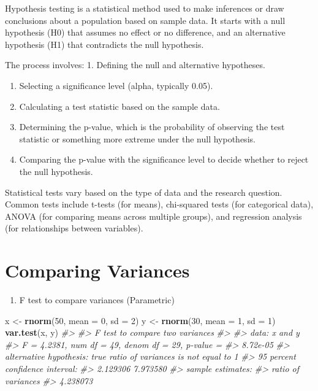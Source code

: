 \documentclass[
]{book}
\newenvironment{Shaded}{\begin{snugshade}}{\end{snugshade}}
\newcommand{\AttributeTok}[1]{\textcolor[rgb]{0.13,0.29,0.53}{#1}}
\newcommand{\CommentTok}[1]{\textcolor[rgb]{0.56,0.35,0.01}{\textit{#1}}}
\newcommand{\DecValTok}[1]{\textcolor[rgb]{0.00,0.00,0.81}{#1}}
\newcommand{\FunctionTok}[1]{\textcolor[rgb]{0.13,0.29,0.53}{\textbf{#1}}}
\newcommand{\NormalTok}[1]{#1}
\newcommand{\OtherTok}[1]{\textcolor[rgb]{0.56,0.35,0.01}{#1}}
\providecommand{\tightlist}{%
  \setlength{\itemsep}{0pt}\setlength{\parskip}{0pt}}
\begin{document}
Hypothesis testing is a statistical method used to make inferences or draw conclusions about a population based on sample data. It starts with a null hypothesis (H0) that assumes no effect or no difference, and an alternative hypothesis (H1) that contradicts the null hypothesis.

The process involves:
1. Defining the null and alternative hypotheses.

\begin{enumerate}
\def\labelenumi{\arabic{enumi}.}
\setcounter{enumi}{1}
\item
  Selecting a significance level (alpha, typically 0.05).
\item
  Calculating a test statistic based on the sample data.
\item
  Determining the p-value, which is the probability of observing the test statistic or something more extreme under the null hypothesis.
\item
  Comparing the p-value with the significance level to decide whether to reject the null hypothesis.
\end{enumerate}

Statistical tests vary based on the type of data and the research question. Common tests include t-tests (for means), chi-squared tests (for categorical data), ANOVA (for comparing means across multiple groups), and regression analysis (for relationships between variables).

\section{Comparing Variances}\label{comparing-variances}

\begin{enumerate}
\def\labelenumi{\alph{enumi}.}
\tightlist
\item
  F test to compare variances (Parametric)
\end{enumerate}

\begin{Shaded}
\begin{Highlighting}[]
\NormalTok{x }\OtherTok{\textless{}{-}} \FunctionTok{rnorm}\NormalTok{(}\DecValTok{50}\NormalTok{, }\AttributeTok{mean =} \DecValTok{0}\NormalTok{, }\AttributeTok{sd =} \DecValTok{2}\NormalTok{)}
\NormalTok{y }\OtherTok{\textless{}{-}} \FunctionTok{rnorm}\NormalTok{(}\DecValTok{30}\NormalTok{, }\AttributeTok{mean =} \DecValTok{1}\NormalTok{, }\AttributeTok{sd =} \DecValTok{1}\NormalTok{)}
\FunctionTok{var.test}\NormalTok{(x, y)}
\CommentTok{\#\textgreater{} }
\CommentTok{\#\textgreater{}  F test to compare two variances}
\CommentTok{\#\textgreater{} }
\CommentTok{\#\textgreater{} data:  x and y}
\CommentTok{\#\textgreater{} F = 4.2381, num df = 49, denom df = 29, p{-}value =}
\CommentTok{\#\textgreater{} 8.72e{-}05}
\CommentTok{\#\textgreater{} alternative hypothesis: true ratio of variances is not equal to 1}
\CommentTok{\#\textgreater{} 95 percent confidence interval:}
\CommentTok{\#\textgreater{}  2.129306 7.973580}
\CommentTok{\#\textgreater{} sample estimates:}
\CommentTok{\#\textgreater{} ratio of variances }
\CommentTok{\#\textgreater{}           4.238073}
\end{Highlighting}
\end{Shaded}
\end{document}
